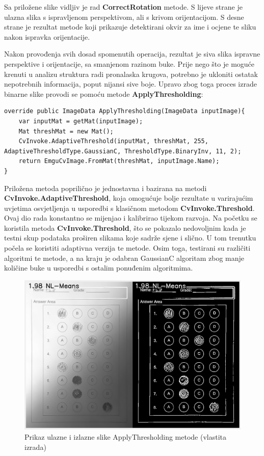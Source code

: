 \documentclass{foi}
\begin{document}
Sa priložene slike vidljiv je rad \textbf{CorrectRotation} metode. S lijeve strane je ulazna slika s ispravljenom perspektivom, ali s krivom orijentacijom. S desne strane je rezultat metode koji prikazuje detektirani okvir za ime i ocjene te sliku nakon ispravka orijentacije.

Nakon provođenja svih dosad spomenutih operacija, rezultat je siva slika ispravne perspektive i orijentacije, sa smanjenom razinom buke. Prije nego što je moguće krenuti u analizu struktura radi pronalaska krugova, potrebno je ukloniti ostatak nepotrebnih informacija, poput nijansi sive boje. Upravo zbog toga proces izrade binarne slike provodi se pomoću metode \textbf{ApplyThresholding}:

\begin{lstlisting}[caption={Metoda za pretvorbu sive slike u binarnu sliku}]
override public ImageData ApplyThresholding(ImageData inputImage){
    var inputMat = getMat(inputImage);
    Mat threshMat = new Mat();
    CvInvoke.AdaptiveThreshold(inputMat, threshMat, 255, AdaptiveThresholdType.GaussianC, ThresholdType.BinaryInv, 11, 2);
    return EmguCvImage.FromMat(threshMat, inputImage.Name);
}
\end{lstlisting}

Priložena metoda poprilično je jednostavna i bazirana na metodi \textbf{CvInvoke.AdaptiveThreshold}, koja omogućuje bolje rezultate u varirajućim uvjetima osvjetljenja u usporedbi s klasičnom metodom \textbf{CvInvoke.Threshold}. Ovaj dio rada konstantno se mijenjao i kalibrirao tijekom razvoja. Na početku se koristila metoda \textbf{CvInvoke.Threshold}, što se pokazalo nedovoljnim kada je testni skup podataka proširen slikama koje sadrže sjene i slično. U tom trenutku počela se koristiti adaptivna verzija te metode. Osim toga, testirani su različiti algoritmi te metode, a na kraju je odabran GaussianC algoritam zbog manje količine buke u usporedbi s ostalim ponuđenim algoritmima.

\begin{figure}[H]
\centering
\includegraphics[width=0.7\linewidth]{slike/TresholdingComparison.png}
\caption{Prikaz ulazne i izlazne slike ApplyThresholding metode (vlastita izrada)}
\end{figure}
\end{document}
